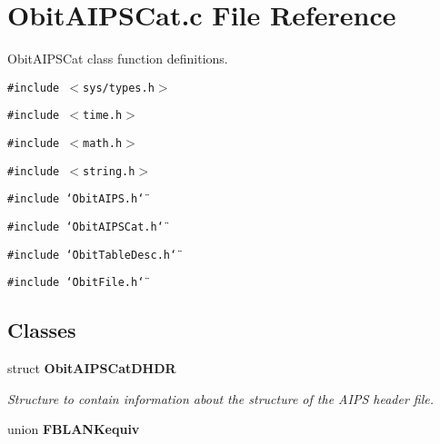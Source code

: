 \section{Obit\-AIPSCat.c File Reference}
\label{ObitAIPSCat_8c}
Obit\-AIPSCat class function definitions. 

{\tt \#include $<$sys/types.h$>$}\par
{\tt \#include $<$time.h$>$}\par
{\tt \#include $<$math.h$>$}\par
{\tt \#include $<$string.h$>$}\par
{\tt \#include \char`\"{}Obit\-AIPS.h\char`\"{}}\par
{\tt \#include \char`\"{}Obit\-AIPSCat.h\char`\"{}}\par
{\tt \#include \char`\"{}Obit\-Table\-Desc.h\char`\"{}}\par
{\tt \#include \char`\"{}Obit\-File.h\char`\"{}}\par
\subsection*{Classes}
\begin{CompactItemize}
\item 
struct {\bf Obit\-AIPSCat\-DHDR}
\begin{CompactList}\small\item\em Structure to contain information about the structure of the AIPS header file. \item\end{CompactList}\item 
union {\bf FBLANKequiv}
\end{CompactItemize}
